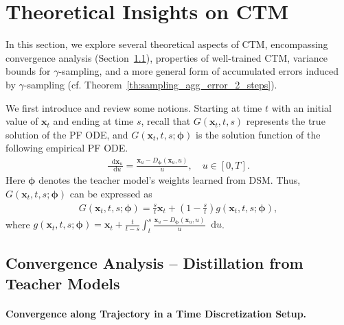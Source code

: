 \documentclass{article} \usepackage{iclr2024_coNFErence,times}
\theoremstyle{definition}
\theoremstyle{remark}
\newcommand*\diff{\mathop{}\!\mathrm{d}}
\begin{document}
\section{Theoretical Insights on CTM}\label{appendix:general_theory}
In this section, we explore several theoretical aspects of CTM, encompassing convergence analysis (Section~\ref{sec:convergence_analysis}), properties of well-trained CTM, variance bounds for $\gamma$-sampling, and a more general form of accumulated errors induced by $\gamma$-sampling (cf. Theorem~\ref{th:sampling_agg_error_2_steps}).

We first introduce and review some notions. Starting at time $t$ with an initial value of $\mathbf{x}_t$ and ending at time $s$, recall that $G(\mathbf{x}_t, t, s)$ represents the true solution of the PF ODE, and $G(\mathbf{x}_t, t, s; \bm{\phi})$ is the solution function of the following empirical PF ODE.
\begin{align}\label{eq:emp_pf_ode}
    \frac{\diff \mathbf{x}_{u}}{\diff {u}} =\frac{\mathbf{x}_{{u}}-D_{\bm{\phi}}(\mathbf{x}_{u},{u}) }{{u}}, \quad u\in[0,T].
\end{align}
Here $\bm{\phi}$ denotes the teacher model's weights learned from DSM. Thus, $G(\mathbf{x}_t, t, s; \bm{\phi})$ can be expressed as
\begin{align*}
    G(\mathbf{x}_t, t, s; \bm{\phi})=\frac{s}{t}\mathbf{x}_t + (1-\frac{s}{t})g(\mathbf{x}_t, t, s;\bm{\phi}),
\end{align*}
where $g(\mathbf{x}_{t},t,s;\bm{\phi})=\mathbf{x}_{t}+\frac{t}{t-s}\int_{t}^{s}\frac{\mathbf{x}_{{u}}-D_{\bm{\phi}}(\mathbf{x}_{u},{u}) }{{u}}\diff u$.



\subsection{Convergence Analysis -- Distillation from Teacher Models}\label{sec:convergence_analysis}

\paragraph{Convergence along Trajectory in a Time Discretization Setup.}
\end{document}
